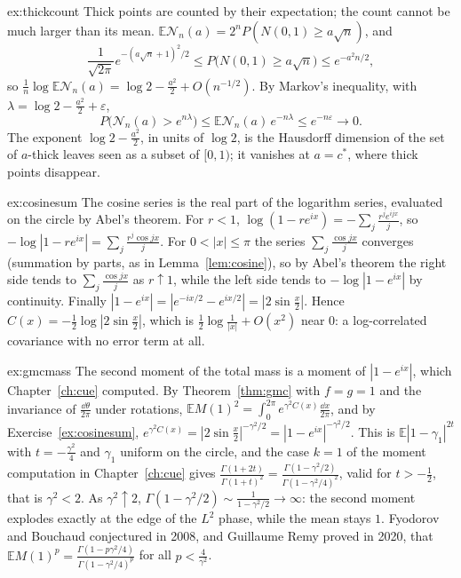 \begin{solution}{ex:thickcount}
\idea Thick points are counted by their expectation; the count cannot be much larger than its mean.
\writeup $\mathbb E\mathcal N_n(a)=2^nP(N(0,1)\ge a\sqrt n)$, and
\[
\frac1{\sqrt{2\pi}}e^{-(a\sqrt n+1)^2/2}\le P\bigl(N(0,1)\ge a\sqrt n\bigr)\le e^{-a^2n/2},
\]
so $\frac1n\log\mathbb E\mathcal N_n(a)=\log2-\frac{a^2}2+O(n^{-1/2})$. By Markov's inequality, with $\lambda=\log2-\frac{a^2}2+\varepsilon$,
\[
P\bigl(\mathcal N_n(a)>e^{n\lambda}\bigr)\le\mathbb E\mathcal N_n(a)\,e^{-n\lambda}\le e^{-n\varepsilon}\to0 .
\] The exponent $\log2-\frac{a^2}2$, in units of $\log 2$, is the Hausdorff dimension of the set of $a$-thick leaves seen as a subset
of $[0,1)$; it vanishes at $a=c^*$, where thick points disappear.
\end{solution}

\begin{solution}{ex:cosinesum}
\idea The cosine series is the real part of the logarithm series, evaluated on the circle by Abel's theorem.
\writeup For $r<1$, $\log(1-re^{ix})=-\sum_j\frac{r^je^{ijx}}j$, so $-\log|1-re^{ix}|=\sum_j\frac{r^j\cos jx}j$. For $0<|x|\le\pi$ the series $\sum_j\frac{\cos jx}j$ converges (summation by parts, as in Lemma~\ref{lem:cosine}), so by Abel's theorem
the right side tends to $\sum_j\frac{\cos jx}j$ as $r\uparrow1$, while the left side tends to $-\log|1-e^{ix}|$ by continuity. Finally $|1-e^{ix}|=|e^{-ix/2}-e^{ix/2}|=|2\sin\frac x2|$. Hence $C(x)=-\frac12\log|2\sin\frac x2|$, which is $\frac12\log\frac1{|x|}+O(x^2)$
near $0$: a log-correlated covariance with no error term at all.
\end{solution}

\begin{solution}{ex:gmcmass}
\idea The second moment of the total mass is a moment of $|1-e^{ix}|$, which Chapter~\ref{ch:cue} computed.
\writeup By Theorem~\ref{thm:gmc} with $f=g=1$ and the invariance of $\frac{\dd\theta}{2\pi}$ under rotations, $\mathbb EM(1)^2=\int_0^{2\pi}e^{\gamma^2C(x)}\frac{\dd x}{2\pi}$, and by Exercise~\ref{ex:cosinesum}, $e^{\gamma^2C(x)}=|2\sin\frac x2|^{-\gamma^2/2}=|1-e^{ix}|^{-\gamma^2/2}$. This is
$\mathbb E|1-\gamma_1|^{2t}$ with $t=-\frac{\gamma^2}4$ and $\gamma_1$ uniform on the circle, and the case $k=1$ of the moment computation in Chapter~\ref{ch:cue} gives $\frac{\Gamma(1+2t)}{\Gamma(1+t)^2}=\frac{\Gamma(1-\gamma^2/2)}{\Gamma(1-\gamma^2/4)^2}$, valid for $t>-\frac12$, that is $\gamma^2<2$. As $\gamma^2\uparrow2$,
$\Gamma(1-\gamma^2/2)\sim\frac1{1-\gamma^2/2}\to\infty$: the second moment explodes exactly at the edge of the $L^2$ phase, while the mean stays $1$. Fyodorov and Bouchaud conjectured in 2008, and Guillaume Remy proved in 2020, that
$\mathbb EM(1)^p=\frac{\Gamma(1-p\gamma^2/4)}{\Gamma(1-\gamma^2/4)^p}$ for all $p<\frac4{\gamma^2}$.
\end{solution}

